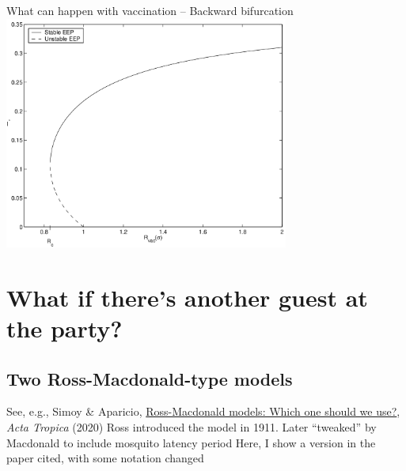\documentclass[aspectratio=169]{beamer}\usepackage[]{graphicx}\usepackage[]{xcolor}
\begin{document}
\begin{frame}{What can happen with vaccination -- Backward bifurcation}
\centering
\includegraphics[width=0.7\textwidth]{FIGS/SIRV_bif_backward}
\end{frame}


\section{What if there's another guest at the party?}

\subsection{Two Ross-Macdonald-type models}
\begin{frame}
See, e.g., Simoy \& Aparicio, \href{https://doi.org/10.1016/j.actatropica.2020.105452}{Ross-Macdonald models: Which one should we use?}, \emph{Acta Tropica} (2020)
\vfill
Ross introduced the model in 1911. Later ``tweaked'' by Macdonald to include mosquito latency period
\vfill
Here, I show a version in the paper cited, with some notation changed
\end{frame}
\end{document}
